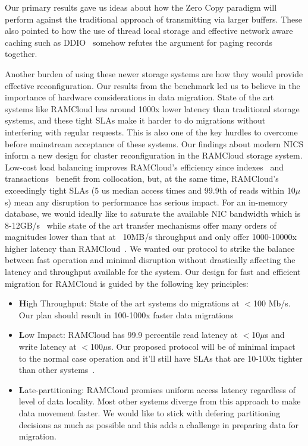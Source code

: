 Our primary results gave us ideas about how the Zero Copy paradigm will perform against
the traditional approach of transmitting via larger buffers. These also pointed 
to how the use of thread local storage and effective network aware caching such as DDIO~\cite{ddio}
somehow refutes the argument for paging records together.

Another burden of using these newer storage systems are how they would provide effective 
reconfiguration. Our results from the benchmark led us to believe in the importance of 
hardware considerations in data migration. State of the art systems like RAMCloud has around 1000x
lower latency than traditional storage systems, and these tight SLAs make it harder to do migrations
without interfering with regular requests. This is also one of the key hurdles 
to overcome before mainstream acceptance of these systems.
Our findings about modern NICS inform a new design for cluster reconfiguration
in the RAMCloud storage system. Low-cost load balancing improves RAMCloud’s
efficiency since indexes~\cite{slik} and transactions~\cite{ramcloudtx} benefit from collocation, but, at the same time, RAMCloud’s exceedingly tight SLAs (5 us median
access times and 99.9th of reads within 10$\mu$s) mean any disruption to performance
has serious impact. For an in-memory database, we would ideally like to saturate the
available NIC bandwidth which is 8-12GB/s~\cite{cx3,cx4} while state of the art 
transfer mechanisms offer many orders of magnitudes lower than that at ~10MB/s 
throughput and only offer 1000-10000x higher latency than RAMCloud~\cite{ramcloud}.
We wanted our protocol to strike the balance between fast operation and minimal disruption without drastically affecting
the latency and throughput available for the system. Our design for fast and efficient migration
for RAMCloud is guided by the following key principles:
\begin{itemize}
\item{\textbf High Throughput}: State of the art systems do migrations at $<$100 Mb/s. Our plan
should result in 100-1000x faster data migrations
\item{\textbf Low Impact}: RAMCloud has 99.9 percentile read latency at $<$10$\mu$s and write latency
at $<$100$\mu$s. Our proposed protocol will be of minimal impact to the normal case operation and it'll
still have SLAs that are 10-100x tighter than other systems~\cite{squall}.
\item{\textbf Late-partitioning}: RAMCloud promises uniform access latency regardless of level of data locality.
Most other systems diverge from this approach to make data movement faster. We would like to stick with
defering partitioning decisions as much as possible and this adds a challenge in preparing data for migration.
\end{itemize}


